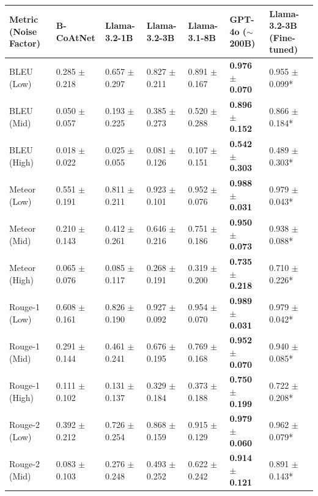 \begin{table}[htbp]
    \centering
    \small
    \begin{tabular}{l|p{2cm}p{2cm}p{2cm}p{2cm}p{2cm}p{2cm}}
        \toprule
        \textbf{Metric (Noise Factor)} & \textbf{B-CoAtNet} & \textbf{Llama-3.2-1B} & \textbf{Llama-3.2-3B} & \textbf{Llama-3.1-8B} & \textbf{GPT-4o ($\sim$200B)} & \textbf{Llama-3.2-3B (Fine-tuned)} \\ \midrule
        BLEU (Low) & 0.285 $\pm$ 0.218 & 0.657 $\pm$ 0.297 & 0.827 $\pm$ 0.211 & 0.891 $\pm$ 0.167 & \textbf{0.976 $\pm$ 0.070} & 0.955 $\pm$ 0.099* \\
        BLEU (Mid) & 0.050 $\pm$ 0.057 & 0.193 $\pm$ 0.225 & 0.385 $\pm$ 0.273 & 0.520 $\pm$ 0.288 & \textbf{0.896 $\pm$ 0.152} & 0.866 $\pm$ 0.184* \\
        BLEU (High) & 0.018 $\pm$ 0.022 & 0.025 $\pm$ 0.055 & 0.081 $\pm$ 0.126 & 0.107 $\pm$ 0.151 & \textbf{0.542 $\pm$ 0.303} & 0.489 $\pm$ 0.303* \\
        \midrule
        Meteor (Low) & 0.551 $\pm$ 0.191 & 0.811 $\pm$ 0.211 & 0.923 $\pm$ 0.101 & 0.952 $\pm$ 0.076 & \textbf{0.988 $\pm$ 0.031} & 0.979 $\pm$ 0.043* \\
        Meteor (Mid) & 0.210 $\pm$ 0.143 & 0.412 $\pm$ 0.261 & 0.646 $\pm$ 0.216 & 0.751 $\pm$ 0.186 & \textbf{0.950 $\pm$ 0.073} & 0.938 $\pm$ 0.088* \\
        Meteor (High) & 0.065 $\pm$ 0.076 & 0.085 $\pm$ 0.117 & 0.268 $\pm$ 0.191 & 0.319 $\pm$ 0.200 & \textbf{0.735 $\pm$ 0.218} & 0.710 $\pm$ 0.226* \\
        \midrule
        Rouge-1 (Low) & 0.608 $\pm$ 0.161 & 0.826 $\pm$ 0.190 & 0.927 $\pm$ 0.092 & 0.954 $\pm$ 0.070 & \textbf{0.989 $\pm$ 0.031} & 0.979 $\pm$ 0.042* \\
        Rouge-1 (Mid) & 0.291 $\pm$ 0.144 & 0.461 $\pm$ 0.241 & 0.676 $\pm$ 0.195 & 0.769 $\pm$ 0.168 & \textbf{0.952 $\pm$ 0.070} & 0.940 $\pm$ 0.085* \\
        Rouge-1 (High) & 0.111 $\pm$ 0.102 & 0.131 $\pm$ 0.137 & 0.329 $\pm$ 0.184 & 0.373 $\pm$ 0.188 & \textbf{0.750 $\pm$ 0.199} & 0.722 $\pm$ 0.208* \\
        \midrule
        Rouge-2 (Low) & 0.392 $\pm$ 0.212 & 0.726 $\pm$ 0.254 & 0.868 $\pm$ 0.159 & 0.915 $\pm$ 0.129 & \textbf{0.979 $\pm$ 0.060} & 0.962 $\pm$ 0.079* \\
        Rouge-2 (Mid) & 0.083 $\pm$ 0.103 & 0.276 $\pm$ 0.248 & 0.493 $\pm$ 0.252 & 0.622 $\pm$ 0.242 & \textbf{0.914 $\pm$ 0.121} & 0.891 $\pm$ 0.143* \\

\end{tabular}
\end{table}
